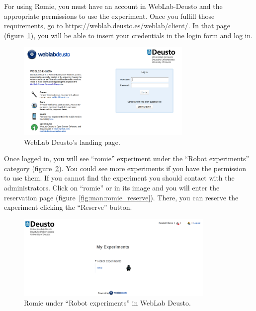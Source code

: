 For using Romie, you must have an account in WebLab-Deusto and the appropriate permissions to use
the experiment. Once you fulfill those requirements, go to
\url{https://weblab.deusto.es/weblab/client/}. In that page (figure~\ref{fig:man:weblab}), you will
be able to insert your credentials in the login form and log in.

\begin{figure}[ht]
	\centering
	\includegraphics[width=0.75\textwidth]{fig/manuals/weblab}
	\caption{WebLab Deusto's landing page.}
	\label{fig:man:weblab}
\end{figure}

Once logged in, you will see ``romie'' experiment under the ``Robot experiments'' category
(figure~\ref{fig:man:romie_weblab}). You could see more experiments if you have the permission to
use them. If you cannot find the experiment you should contact with the administrators. Click on
``romie'' or in its image and you will enter the reservation page
(figure~\ref{fig:man:romie_reserve}). There, you can reserve the experiment clicking the ``Reserve''
button.

\begin{figure}[!htbp]
	\centering
	\includegraphics[width=0.85\textwidth]{fig/manuals/trivial/romie-weblab}
	\caption{Romie under ``Robot experiments'' in WebLab Deusto.}
	\label{fig:man:romie_weblab}
\end{figure}

